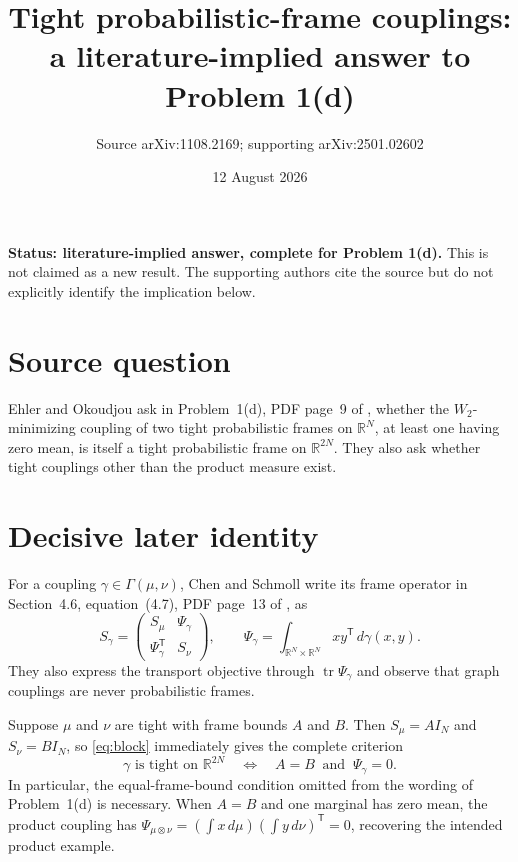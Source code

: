 \documentclass[11pt]{article}
\title{Tight probabilistic-frame couplings:\\
a literature-implied answer to Problem 1(d)}
\author{Source arXiv:1108.2169; supporting arXiv:2501.02602}
\date{12 August 2026}
\begin{document}
\maketitle

\noindent\textbf{Status: literature-implied answer, complete for Problem 1(d).}
This is not claimed as a new result.  The supporting authors cite the source
but do not explicitly identify the implication below.

\section*{Source question}

Ehler and Okoudjou ask in Problem~1(d), PDF page~9 of \cite{source}, whether the
$W_2$-minimizing coupling of two tight probabilistic frames on $\mathbb R^N$,
at least one having zero mean, is itself a tight probabilistic frame on
$\mathbb R^{2N}$.  They also ask whether tight couplings other than the product
measure exist.

\section*{Decisive later identity}

For a coupling $\gamma\in\Gamma(\mu,\nu)$, Chen and Schmoll write its frame
operator in Section~4.6, equation~(4.7), PDF page~13 of \cite{support}, as
\begin{equation}\label{eq:block}
 S_\gamma=
 \begin{pmatrix}
 S_\mu&\Psi_\gamma\\
 \Psi_\gamma^{\mathsf T}&S_\nu
 \end{pmatrix},
 \qquad
 \Psi_\gamma=\int_{\mathbb R^N\times\mathbb R^N}
 xy^{\mathsf T}\,d\gamma(x,y).
\end{equation}
They also express the transport objective through $\operatorname{tr}
\Psi_\gamma$ and observe that graph couplings are never probabilistic frames.

Suppose $\mu$ and $\nu$ are tight with frame bounds $A$ and $B$.  Then
$S_\mu=A I_N$ and $S_\nu=B I_N$, so \eqref{eq:block} immediately gives the
complete criterion
\begin{equation}\label{eq:criterion}
 \gamma\text{ is tight on }\mathbb R^{2N}
 \quad\Longleftrightarrow\quad
 A=B\ \text{ and }\ \Psi_\gamma=0.
\end{equation}
In particular, the equal-frame-bound condition omitted from the wording of
Problem~1(d) is necessary.  When $A=B$ and one marginal has zero mean, the
product coupling has
$\Psi_{\mu\otimes\nu}=(\int x\,d\mu)(\int y\,d\nu)^{\mathsf T}=0$, recovering
the intended product example.
\end{document}
